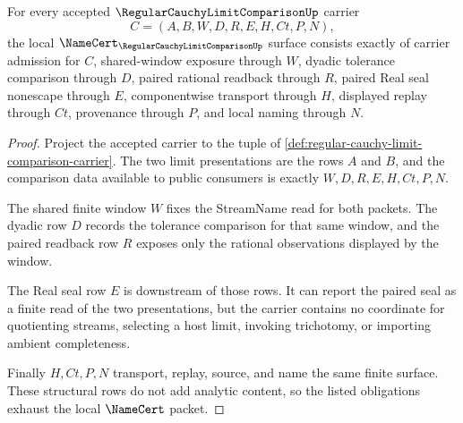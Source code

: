 \begin{theorem}
\label{thm:regular-cauchy-limit-comparison-namecert-obligations}
For every accepted $\RegularCauchyLimitComparisonUp$ carrier
$$
C=(A,B,W,D,R,E,H,Ct,P,N),
$$
the local $\NameCert_{\RegularCauchyLimitComparisonUp}$ surface consists exactly of carrier admission for $C$, shared-window exposure through $W$, dyadic tolerance comparison through $D$, paired rational readback through $R$, paired Real seal nonescape through $E$, componentwise transport through $H$, displayed replay through $Ct$, provenance through $P$, and local naming through $N$.
\end{theorem}
\begin{proof}
Project the accepted carrier to the tuple of \autoref{def:regular-cauchy-limit-comparison-carrier}. The two limit presentations are the rows $A$ and $B$, and the comparison data available to public consumers is exactly $W,D,R,E,H,Ct,P,N$.

The shared finite window $W$ fixes the StreamName read for both packets. The dyadic row $D$ records the tolerance comparison for that same window, and the paired readback row $R$ exposes only the rational observations displayed by the window.

The Real seal row $E$ is downstream of those rows. It can report the paired seal as a finite read of the two presentations, but the carrier contains no coordinate for quotienting streams, selecting a host limit, invoking trichotomy, or importing ambient completeness.

Finally $H,Ct,P,N$ transport, replay, source, and name the same finite surface. These structural rows do not add analytic content, so the listed obligations exhaust the local $\NameCert$ packet.
\end{proof}

